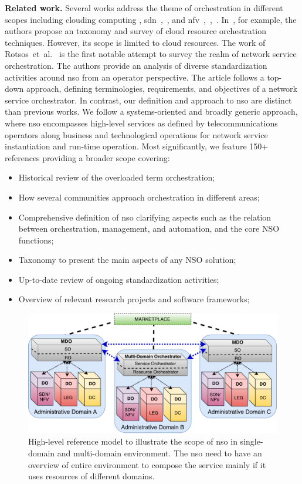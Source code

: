 \noindent \textbf{Related work.} Several works address the theme of orchestration in different scopes including clouding computing \cite{Weerasiri2017}, \gls{sdn}~\cite{Jarraya2014},~\cite{surveySDN}, and \gls{nfv}~\cite{YongLi2015Software-DefinedSurvey},~\cite{Mijumbi2016NetworkChallenges},~\cite{Bhamare2016}. In~\cite{Weerasiri2017}, for example, the authors propose an taxonomy and survey of cloud resource orchestration techniques. However, its scope is limited to cloud resources. The work of Rotsos~et~al.~\cite{Rotsos2017NetworkSurvey} is the first notable attempt to survey the realm of network service orchestration. The authors provide an analysis of diverse standardization activities around \gls{nso} from an operator perspective. The article follows a top-down approach, defining terminologies, requirements, and objectives of a network service orchestrator. In contrast, our definition and approach to \gls{nso} are distinct than previous works. We follow a systems-oriented and broadly generic approach,  where \gls{nso} encompasses high-level services as defined by telecommunications operators along business and technological operations for network service instantiation and run-time operation. Most significantly, we feature 150+ references providing a broader scope covering:
\begin{itemize}
\item Historical review of the overloaded term orchestration;
\item How several communities approach orchestration in different areas;
\item Comprehensive definition of \gls{nso} clarifying aspects such as the relation between orchestration, management, and automation, and the core NSO functions;
\item Taxonomy to present the main aspects of any NSO solution;
\item Up-to-date review of ongoing standardization activities;
\item Overview of relevant research projects and software frameworks;
\end{itemize}

\begin{figure}[th]
  \centering
  \includegraphics[scale=.6]{Figures/01_Introduction/nso}
    \caption{High-level reference model to illustrate the scope of \acrfull{nso} in single-domain and multi-domain environment. The \gls{nso}  need to have an overview of entire environment to compose the service mainly if it uses resources of different domains.}
    \label{mdo}
\end{figure}

